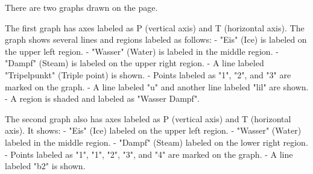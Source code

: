 There are two graphs drawn on the page.

The first graph has axes labeled as P (vertical axis) and T (horizontal axis). The graph shows several lines and regions labeled as follows:
- "Eis" (Ice) is labeled on the upper left region.
- "Wasser" (Water) is labeled in the middle region.
- "Dampf" (Steam) is labeled on the upper right region.
- A line labeled "Tripelpunkt" (Triple point) is shown.
- Points labeled as "1", "2", and "3" are marked on the graph.
- A line labeled "u" and another line labeled "lil" are shown.
- A region is shaded and labeled as "Wasser Dampf".

The second graph also has axes labeled as P (vertical axis) and T (horizontal axis). It shows:
- "Eis" (Ice) labeled on the upper left region.
- "Wasser" (Water) labeled in the middle region.
- "Dampf" (Steam) labeled on the lower right region.
- Points labeled as "1", "1", "2", "3", and "4" are marked on the graph.
- A line labeled "b2" is shown.